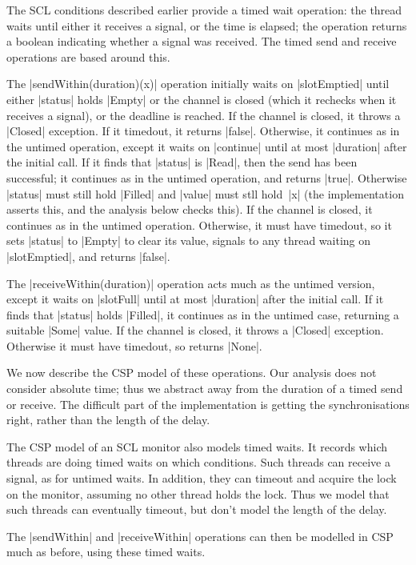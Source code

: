 The SCL conditions described earlier provide a timed wait operation: the
thread waits until either it receives a signal, or the time is elapsed; the
operation returns a boolean indicating whether a signal was received.  The
timed send and receive operations are based around this. 

The |sendWithin(duration)(x)| operation initially waits on |slotEmptied| until
either |status| holds |Empty| or the channel is closed (which it rechecks when
it receives a signal), or the deadline is reached.  If the channel is closed,
it throws a |Closed| exception.  If it timedout, it returns |false|.
Otherwise, it continues as in the untimed operation, except it waits on
|continue| until at most |duration| after the initial call.  If it finds that
|status| is |Read|, then the send has been successful; it continues as in the
untimed operation, and returns |true|.  Otherwise |status| must still hold
|Filled| and |value| must stll hold~|x| (the implementation asserts this, and
the analysis below checks this).  If the channel is closed, it continues as in
the untimed operation.  Otherwise, it must have timedout, so it sets |status|
to |Empty| to clear its value, signals to any thread waiting on |slotEmptied|,
and returns |false|.

The |receiveWithin(duration)| operation acts much as the untimed version,
except it waits on |slotFull| until at most |duration| after the initial
call.  If it finds that |status| holds |Filled|, it continues as in the
untimed case, returning a suitable |Some| value.  If the channel is closed, it
throws a |Closed| exception.  Otherwise it must have timedout, so returns
|None|.  


We now describe the CSP model of these operations.  Our analysis does not
consider absolute time; thus we abstract away from the duration of a timed
send or receive.  The difficult part of the implementation is getting the
synchronisations right, rather than the length of the delay. 

The CSP model of an SCL monitor also models timed waits.  It records which
threads are doing timed waits on which conditions.  Such threads can receive a
signal, as for untimed waits.  In addition, they can timeout and acquire the
lock on the monitor, assuming no other thread holds the lock.  Thus we model
that such threads can eventually timeout, but don't model the length of the
delay. 

The |sendWithin| and |receiveWithin| operations can then be modelled in CSP
much as before, using these timed waits.


